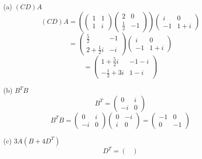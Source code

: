 \documentclass[a4paper]{article}
\theoremstyle{break}
\theoremstyle{break}
\theoremstyle{break}
\theoremstyle{break}
\begin{document}
\begin{enumerate}
	\item[(a)] \( (CD)A \)
	      \[
		      (CD)A =
		      \left(
		      \begin{pmatrix}
				      1 & 1 \\
				      1 & i
			      \end{pmatrix}
		      \begin{pmatrix}
				      2           & 0  \\
				      \frac{1}{2} & -1
			      \end{pmatrix}
		      \right)
		      \begin{pmatrix}
			      i  & 0   \\
			      -1 & 1+i
		      \end{pmatrix}
	      \]
	      \[
		      =
		      \begin{pmatrix}
			      \frac{5}{2}      & -1 \\
			      2 + \frac{1}{2}i & -i
		      \end{pmatrix}
		      \begin{pmatrix}
			      i  & 0   \\
			      -1 & 1+i
		      \end{pmatrix}
	      \]
	      \[
		      = \begin{pmatrix}
			      1 + \frac{5}{2}i  & -1 -i \\
			      -\frac{1}{2} + 3i & 1 - i
		      \end{pmatrix}
	      \]
	\item[(b)] \( B^TB \)
	      \[
		      B^T = \begin{pmatrix}
			      0  & i \\
			      -i & 0
		      \end{pmatrix}
	      \]
	      \[
		      B^TB = \begin{pmatrix}
			      0  & i \\
			      -i & 0
		      \end{pmatrix}
		      \begin{pmatrix}
			      0 & -i \\
			      i & 0
		      \end{pmatrix}
		      = \begin{pmatrix}
			      -1 & 0  \\
			      0  & -1
		      \end{pmatrix}
	      \]
	\item[(c)] \( 3A\left(B + 4D^T\right) \)
	      \[
		      D^T = \begin{pmatrix}

\end{pmatrix}\]
\end{enumerate}
\end{document}
